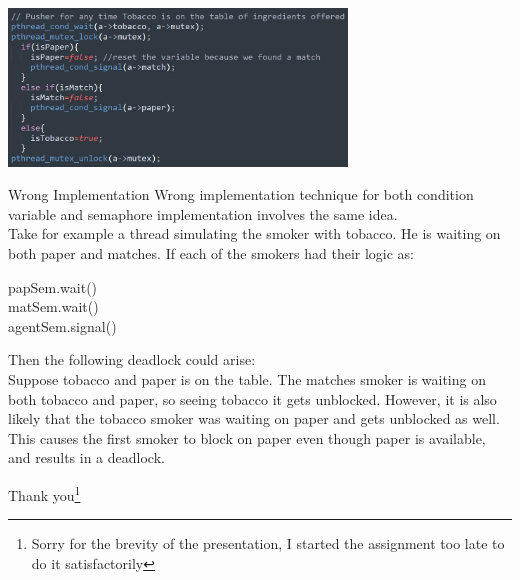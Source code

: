 \documentclass[dvipsnames]{beamer}
\theoremstyle{definition}
\begin{document}
\begin{frame}
\begin{center}
    \includegraphics[width=9cm]{cs4.jpg}
\end{center}
\end{frame}

\begin{frame}{Wrong Implementation}
Wrong implementation technique for both condition variable and semaphore implementation involves the same idea. \\
Take for example a thread simulating the smoker with tobacco. He is waiting on both paper and matches. If each of the smokers had their logic as:
\begin{tcolorbox}
papSem.wait()\\
matSem.wait()\\
agentSem.signal()\\
\end{tcolorbox}
\end{frame}

\begin{frame}
Then the following deadlock could arise:\\
Suppose tobacco and paper is on the table. The matches smoker is waiting on both tobacco and paper, so seeing tobacco it gets unblocked. However, it is also likely that the tobacco smoker was waiting on paper and gets unblocked as well. This causes the first smoker to block on paper even though paper is available, and results in a deadlock. 
\end{frame}

\begin{frame}
\centering
Thank you\footnote{\tiny{Sorry for the brevity of the presentation, I started the assignment too late to do it satisfactorily}}

\end{frame}
\end{document}
